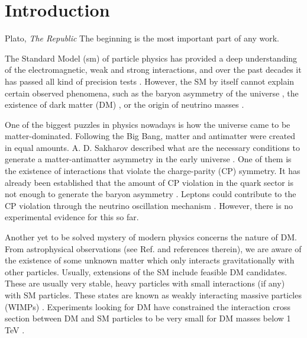 \chapter{Introduction}
\label{chapter:introduction}


\begin{chapquote}{Plato, \textit{The Republic}}
	The beginning is the most important part of any work.
\end{chapquote}

The Standard Model (\gls{sm}) of particle physics \cite{Glashow1961,Weinberg1967,Salam1968} has provided a deep understanding of the electromagnetic, weak and strong interactions, and over the past decades it has passed all kind of precision tests \cite{Erler2019}. However, the SM by itself cannot explain certain observed phenomena, such as the baryon asymmetry of the universe \cite{Canetti2012}, the existence of dark matter (DM) \cite{Bertone2004}, or the origin of neutrino masses \cite{King2014}.

One of the biggest puzzles in physics nowadays is how the universe came to be matter-dominated. Following the Big Bang, matter and antimatter were created in equal amounts. A. D. Sakharov described what are the necessary conditions to generate a matter-antimatter asymmetry in the early universe \cite{Sakharov1967}. One of them is the existence of interactions that violate the charge-parity (CP) symmetry. It has already been established that the amount of CP violation in the quark sector is not enough to generate the baryon asymmetry \cite{Gavela1993}. Leptons could contribute to the CP violation through the neutrino oscillation mechanism \cite{Akhmedov1998}. However, there is no experimental evidence for this so far.

Another yet to be solved mystery of modern physics concerns the nature of DM. From astrophysical observations (see Ref. \cite{Bertone2004} and references therein), we are aware of the existence of some unknown matter which only interacts gravitationally with other particles. Usually, extensions of the SM include feasible DM candidates. These are usually very stable, heavy particles with small interactions (if any) with SM particles. These states are known as weakly interacting massive particles (WIMPs) \cite{Lee1977,Jungman1995}. Experiments looking for DM have constrained the interaction cross section between DM and SM particles to be very small for DM masses below 1 TeV \cite{Arcadi2024}.

